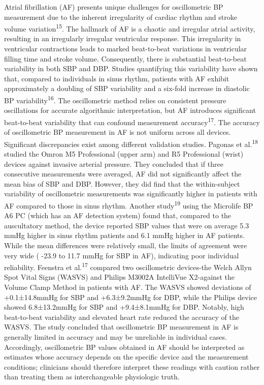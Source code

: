 \documentclass[
  12pt,
  letterpaper,
  openany,
  oneside]{book}
\begin{document}
Atrial fibrillation (AF) presents unique challenges for oscillometric BP
measurement due to the inherent irregularity of cardiac rhythm and
stroke volume variation\textsuperscript{15}. The hallmark of AF is a
chaotic and irregular atrial activity, resulting in an irregularly
irregular ventricular response. This irregularity in ventricular
contractions leads to marked beat-to-beat variations in ventricular
filling time and stroke volume. Consequently, there is substantial
beat-to-beat variability in both SBP and DBP. Studies quantifying this
variability have shown that, compared to individuals in sinus rhythm,
patients with AF exhibit approximately a doubling of SBP variability and
a six-fold increase in diastolic BP variability\textsuperscript{16}. The
oscillometric method relies on consistent pressure oscillations for
accurate algorithmic interpretation, but AF introduces significant
beat-to-beat variability that can confound measurement
accuracy\textsuperscript{17}. The accuracy of oscillometric BP
measurement in AF is not uniform across all devices. Significant
discrepancies exist among different validation studies. Pagonas et
al.\textsuperscript{18} studied the Omron M5 Professional (upper arm)
and R5 Professional (wrist) devices against invasive arterial pressure.
They concluded that if three consecutive measurements were averaged, AF
did not significantly affect the mean bias of SBP and DBP. However, they
did find that the within-subject variability of oscillometric
measurements was significantly higher in patients with AF compared to
those in sinus rhythm. Another study\textsuperscript{19} using the
Microlife BP A6 PC (which has an AF detection system) found that,
compared to the auscultatory method, the device reported SBP values that
were on average 5.3 mmHg higher in sinus rhythm patients and 6.1 mmHg
higher in AF patients. While the mean differences were relatively small,
the limits of agreement were very wide ( -23.9 to 11.7 mmHg for SBP in
AF), indicating poor individual reliability. Feenstra et
al.\textsuperscript{17} compared two oscillometric devices-the Welch
Allyn Spot Vital Signs (WASVS) and Philips M3002A IntelliVue X2-against
the Volume Clamp Method in patients with AF. The WASVS showed deviations
of +0.1±14.8mmHg for SBP and +6.3±9.2mmHg for DBP, while the Philips
device showed 6.8±13.2mmHg for SBP and +9.4±8.1mmHg for DBP. Notably,
high beat-to-beat variability and elevated heart rate reduced the
accuracy of the WASVS. The study concluded that oscillometric BP
measurement in AF is generally limited in accuracy and may be unreliable
in individual cases. Accordingly, oscillometric BP values obtained in AF
should be interpreted as estimates whose accuracy depends on the
specific device and the measurement conditions; clinicians should
therefore interpret these readings with caution rather than treating
them as interchangeable physiologic truth.
\end{document}

